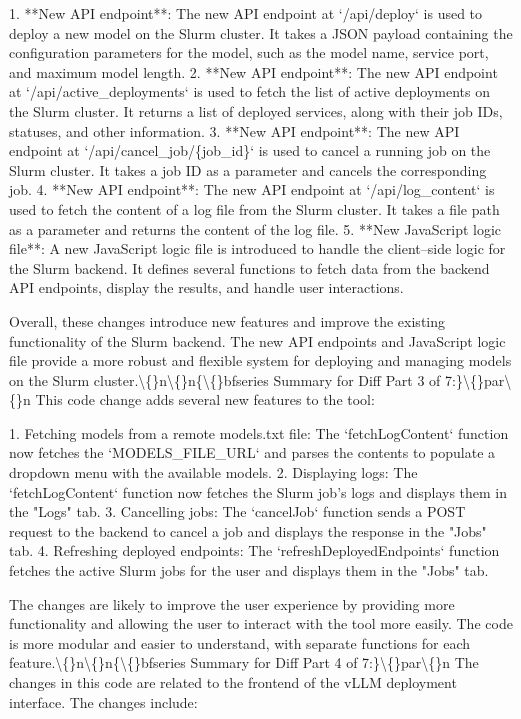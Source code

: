 \documentclass{article}
\begin{document}
{1. **New API endpoint**: The new API endpoint at `/api/deploy` is used to deploy a new model on the Slurm cluster. It takes a JSON payload containing the configuration parameters for the model, such as the model name, service port, and maximum model length.
2. **New API endpoint**: The new API endpoint at `/api/active\_deployments` is used to fetch the list of active deployments on the Slurm cluster. It returns a list of deployed services, along with their job IDs, statuses, and other information.
3. **New API endpoint**: The new API endpoint at `/api/cancel\_job/\{job\_id\}` is used to cancel a running job on the Slurm cluster. It takes a job ID as a parameter and cancels the corresponding job.
4. **New API endpoint**: The new API endpoint at `/api/log\_content` is used to fetch the content of a log file from the Slurm cluster. It takes a file path as a parameter and returns the content of the log file.
5. **New JavaScript logic file**: A new JavaScript logic file is introduced to handle the client--side logic for the Slurm backend. It defines several functions to fetch data from the backend API endpoints, display the results, and handle user interactions.

Overall, these changes introduce new features and improve the existing functionality of the Slurm backend. The new API endpoints and JavaScript logic file provide a more robust and flexible system for deploying and managing models on the Slurm cluster.\textbackslash\{\}n\textbackslash\{\}n\{\textbackslash\{\}bfseries Summary for Diff Part 3 of 7:\}\textbackslash\{\}par\textbackslash\{\}n  This code change adds several new features to the tool:

1. Fetching models from a remote models.txt file: The `fetchLogContent` function now fetches the `MODELS\_FILE\_URL` and parses the contents to populate a dropdown menu with the available models.
2. Displaying logs: The `fetchLogContent` function now fetches the Slurm job's logs and displays them in the "Logs" tab.
3. Cancelling jobs: The `cancelJob` function sends a POST request to the backend to cancel a job and displays the response in the "Jobs" tab.
4. Refreshing deployed endpoints: The `refreshDeployedEndpoints` function fetches the active Slurm jobs for the user and displays them in the "Jobs" tab.

The changes are likely to improve the user experience by providing more functionality and allowing the user to interact with the tool more easily. The code is more modular and easier to understand, with separate functions for each feature.\textbackslash\{\}n\textbackslash\{\}n\{\textbackslash\{\}bfseries Summary for Diff Part 4 of 7:\}\textbackslash\{\}par\textbackslash\{\}n  The changes in this code are related to the frontend of the vLLM deployment interface. The changes include:

}
\end{document}
